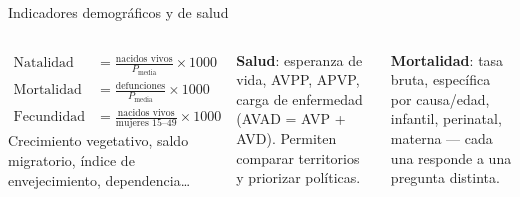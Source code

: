 \documentclass[aspectratio=169,8pt]{beamer}
\begin{document}
\begin{frame}{Indicadores demogr\'aficos y de salud}
  \small
  \begin{columns}[T,onlytextwidth]
      \begin{tcolorbox}[formulabox,title=Demogr\'aficos]
        \footnotesize
        \begin{align*}
          \text{Natalidad} &= \tfrac{\text{nacidos vivos}}{P_{\text{media}}}\times1000\\
          \text{Mortalidad} &= \tfrac{\text{defunciones}}{P_{\text{media}}}\times1000\\
          \text{Fecundidad} &= \tfrac{\text{nacidos vivos}}{\text{mujeres 15--49}}\times1000
        \end{align*}
        Crecimiento vegetativo, saldo migratorio, \'indice de envejecimiento, dependencia\ldots
      \end{tcolorbox}
      \begin{tcolorbox}[tealbox]
        \footnotesize\textbf{Salud}: esperanza de vida, AVPP, APVP, carga de enfermedad (AVAD = AVP + AVD). Permiten comparar territorios y priorizar pol\'iticas.
      \end{tcolorbox}
      \begin{tcolorbox}[infobox]
        \scriptsize\textbf{Mortalidad}: tasa bruta, espec\'ifica por causa/edad, infantil, perinatal, materna --- cada una responde a una pregunta distinta.
      \end{tcolorbox}
    \end{columns}
\end{frame}
\end{document}
